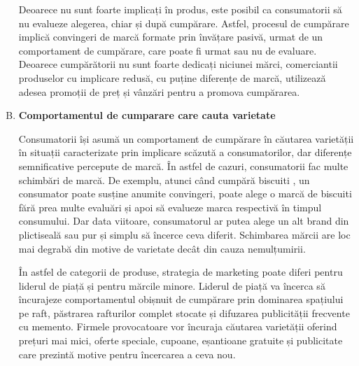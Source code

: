 \documentclass[a4paper, 12pt]{article}
\begin{document}
\begin{enumerate}[A)]
				\quad Deoarece nu sunt foarte implicați în produs, este posibil ca consumatorii să nu evalueze alegerea, chiar și după cumpărare. Astfel, procesul de cumpărare implică convingeri de marcă formate prin învățare pasivă, urmat de un comportament de cumpărare, care poate fi urmat sau nu de evaluare. Deoarece cumpărătorii nu sunt foarte dedicați niciunei mărci, comerciantii produselor cu implicare redusă, cu puține diferențe de marcă, utilizează adesea promoții de preț și vânzări pentru a promova cumpărarea.
				\item \textbf{Comportamentul de cumparare care cauta varietate}
				
				\quad Consumatorii își asumă un comportament de cumpărare în căutarea varietății în situații caracterizate prin implicare scăzută a consumatorilor, dar diferențe semnificative percepute de marcă. În astfel de cazuri, consumatorii fac multe schimbări de marcă. De exemplu, atunci când cumpără biscuiti , un consumator poate susține anumite convingeri, poate alege o marcă de biscuiti fără prea multe evaluări și apoi să evalueze marca respectivă în timpul consumului. Dar data viitoare, consumatorul ar putea alege un alt brand din plictiseală sau pur și simplu să încerce ceva diferit. Schimbarea mărcii are loc mai degrabă din motive de varietate decât din cauza nemulțumirii.
				
				\quad În astfel de categorii de produse, strategia de marketing poate diferi pentru liderul de piață și pentru mărcile minore. Liderul de piață va încerca să încurajeze comportamentul obișnuit de cumpărare prin dominarea spațiului pe raft, păstrarea rafturilor complet stocate și difuzarea publicității frecvente cu memento. Firmele provocatoare vor încuraja căutarea varietății oferind prețuri mai mici, oferte speciale, cupoane, eșantioane gratuite și publicitate care prezintă motive pentru încercarea a ceva nou.
			\end{enumerate}
\end{document}
